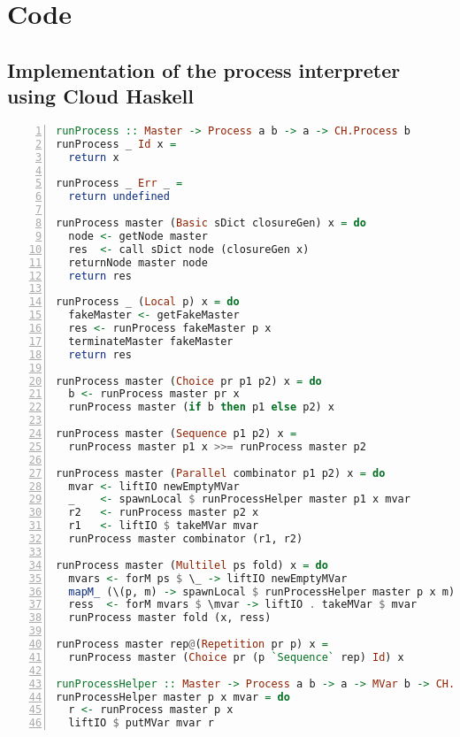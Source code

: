\chapter{Code}

\clearpage

\section{Implementation of the process interpreter using Cloud Haskell}
\label{app:distributed_split_slice}
\begin{lstlisting}[language=Haskell,frame=tb,numbers=left,caption=Implementation of \texttt{runProcess} using \textsf{Cloud Haskell}.]
runProcess :: Master -> Process a b -> a -> CH.Process b
runProcess _ Id x =
  return x

runProcess _ Err _ =
  return undefined

runProcess master (Basic sDict closureGen) x = do
  node <- getNode master
  res  <- call sDict node (closureGen x)
  returnNode master node
  return res

runProcess _ (Local p) x = do
  fakeMaster <- getFakeMaster
  res <- runProcess fakeMaster p x
  terminateMaster fakeMaster
  return res

runProcess master (Choice pr p1 p2) x = do
  b <- runProcess master pr x
  runProcess master (if b then p1 else p2) x

runProcess master (Sequence p1 p2) x =
  runProcess master p1 x >>= runProcess master p2

runProcess master (Parallel combinator p1 p2) x = do
  mvar <- liftIO newEmptyMVar
  _    <- spawnLocal $ runProcessHelper master p1 x mvar
  r2   <- runProcess master p2 x
  r1   <- liftIO $ takeMVar mvar
  runProcess master combinator (r1, r2)

runProcess master (Multilel ps fold) x = do
  mvars <- forM ps $ \_ -> liftIO newEmptyMVar
  mapM_ (\(p, m) -> spawnLocal $ runProcessHelper master p x m)   (ps `zip` mvars)
  ress  <- forM mvars $ \mvar -> liftIO . takeMVar $ mvar
  runProcess master fold (x, ress)

runProcess master rep@(Repetition pr p) x =
  runProcess master (Choice pr (p `Sequence` rep) Id) x

runProcessHelper :: Master -> Process a b -> a -> MVar b -> CH.Process ()
runProcessHelper master p x mvar = do
  r <- runProcess master p x
  liftIO $ putMVar mvar r
\end{lstlisting}

